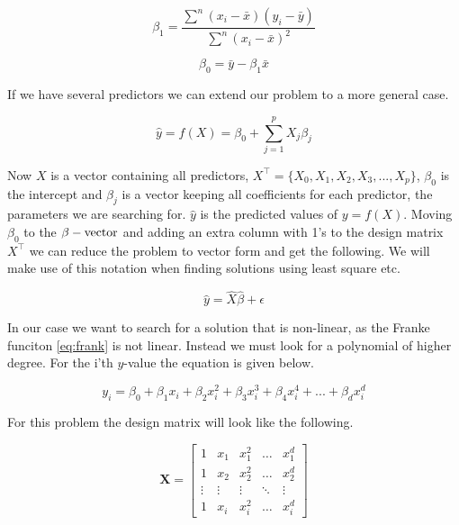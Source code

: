 \documentclass[a4paper,12pt, english]{article}
\begin{document}
\begin{equation}
\beta_1 = \frac{\sum^n (x_i - \bar{x})(y_i - \bar{y})}{\sum^n (x_i - \bar{x})^2}
\end{equation}

\begin{equation}
\beta_0 = \bar{y} - \beta_1 \bar{x}
\end{equation}

If we have several predictors we can extend our problem to a more general case.

\begin{equation}
\hat{y} = f(X) = \beta_{0} + \sum_{j=1}^{p} X_{j} \beta_{j}
\end{equation}

Now $X$ is a vector containing all predictors, $X^{\top} = \{X_0, X_1, X_2, X_3,..., X_p\}$, $\beta_0$ is the intercept and $\beta_j$ is a vector keeping all coefficients for each predictor, the parameters we are searching for. $\hat{y}$ is the predicted values of $y = f(X)$. Moving $\beta_0$ to the $\beta-\textnormal{vector}$ and adding an extra column with 1's to the design matrix $X^{\top}$ we can reduce the problem to vector form and get the following. We will make use of this notation when finding solutions using least square etc. 

\begin{equation} \label{eq:y_predict}
\hat{y} = \hat{X} \hat{\beta} + \epsilon
\end{equation}

In our case we want to search for a solution that is non-linear, as the Franke funciton \ref{eq:frank} is not linear. Instead we must look for a polynomial of higher degree. For the i'th $y$-value the equation is given below.

\begin{equation}
y_i = \beta_0 + \beta_1 x_i + \beta_2 x_i^{2} + \beta_3 x_i^{3} + \beta_4 x_i^{4} + ... + \beta_d x_i^{d}
\end{equation}

For this problem the design matrix will look like the following.

\begin{equation}
\mathbf{X} = 
\begin{bmatrix}
1 & x_1 & x_1^2 & \dots  & x_1^d \\
1 & x_2 & x_2^2 & \dots  & x_2^d \\
\vdots & \vdots & \vdots & \ddots & \vdots \\
1 & x_i & x_i^2 & \dots  & x_i^d
\end{bmatrix}
\end{equation}
\end{document}

